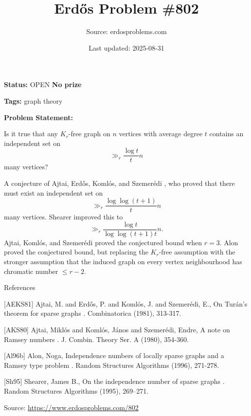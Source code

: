 \documentclass{article}
\title{Erd\H{o}s Problem \#802}
\date{Last updated: 2025-08-31}
\author{Source: erdosproblems.com}
\begin{document}
\maketitle

\noindent\textbf{Status:} OPEN \quad \textbf{No prize}

\noindent\textbf{Tags:} graph theory

\medskip

\noindent\textbf{Problem Statement:}

Is it true that any $K_r$-free graph on $n$ vertices with average degree $t$ contains an independent set on\[\gg_r \frac{\log t}{t}n\]many vertices?




A conjecture of Ajtai, Erd\H{o}s, Koml\'{o}s, and Szemer\'{e}di \cite{AEKS81}, who proved that there must exist an independent set on\[\gg_r \frac{\log\log(t+1)}{t}n\]many vertices. Shearer \cite{Sh95} improved this to\[\gg_r \frac{\log t}{\log\log(t+1)t}n.\]Ajtai, Koml\'{o}s, and Szemer\'{e}di \cite{AKS80} proved the conjectured bound when $r=3$. Alon \cite{Al96b} proved the conjectured bound, but replacing the $K_r$-free assumption with the stronger assumption that the induced graph on every vertex neighbourhood has chromatic number $\leq r-2$.




References

[AEKS81] Ajtai, M. and Erd\H{o}s, P. and Koml\'{o}s, J. and Szemer\'{e}di, E., On Tur\'{a}n's theorem for sparse graphs . Combinatorica (1981), 313-317.

[AKS80] Ajtai, Mikl\'{o}s and Koml\'{o}s, J\'{a}nos and Szemer\'{e}di, Endre, A note on Ramsey numbers . J. Combin. Theory Ser. A (1980), 354-360.

[Al96b] Alon, Noga, Independence numbers of locally sparse graphs and a Ramsey type problem . Random Structures Algorithms (1996), 271-278.

[Sh95] Shearer, James B., On the independence number of sparse graphs . Random Structures Algorithms (1995), 269--271.


\bigskip
\noindent\small{Source: \url{https://www.erdosproblems.com/802}}
\end{document}
